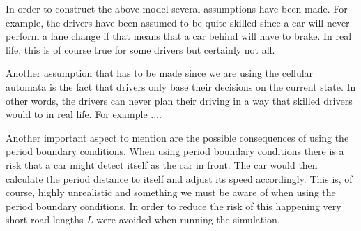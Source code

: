 \documentclass[a4paper,12pt]{article}
\begin{document}
In order to construct the above model several assumptions have been made. For example, the drivers have been assumed to be quite skilled
since a car will never perform a lane change if that means that a car behind will have to brake. In real life, this is of course true for some drivers 
but certainly not all.

Another assumption that has to be made since we are using the cellular automata is the fact that drivers only base their decisions on the current state. In other words, 
the drivers can never plan their driving in a way that skilled drivers would to in real life. For example ....

Another important aspect to mention are the possible consequences of using the period boundary conditions. When using period boundary conditions there is a risk
that a car might detect itself as the car in front. The car would then calculate the period distance to itself and adjust its speed accordingly. 
This is, of course, highly unrealistic and something we must be aware of when using the period boundary conditions. In order to reduce the risk of this happening
very short road lengths $L$ were avoided when running the simulation.
\end{document}
